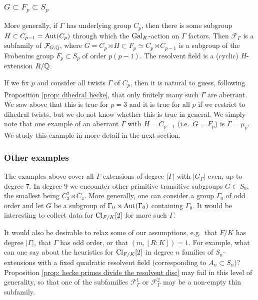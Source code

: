 \documentclass[11pt,a4paper]{amsart}
\newcommand{\artane}[1]{{\color{red} \sf $\clubsuit\clubsuit\clubsuit$ Artane: [#1]}}
\def\Q{{\rm \mathbb{Q}}}
\def\Aut{{\rm Aut}}
\def\Cl{{\rm Cl}}
\def\Gal{{\rm Gal}}
\numberwithin{equation}{section}
\begin{document}
\subsubsection{$G \subset F_p \subset S_p$}

More generally, if $\Gamma$ has underlying group $C_p$, then there is some subgroup $H \subset C_{p-1} = \Aut(C_p)$ through which the $\Gal_K$-action on $\Gamma$ factors. Then $\mathcal{F}_\Gamma$ is a subfamily of $\mathcal{F}_{G, \Q}$, where $G = C_p \rtimes H \subset F_p \simeq C_p \rtimes C_{p-1}$ is a subgroup of the Frobenius group $F_p \subset S_p$ of order $p(p-1)$.  The resolvent field is a (cyclic) $H$-extension $R/\Q$.

If we fix $p$ and consider all twists $\Gamma$ of $\underline{C_p}$, then it is natural to guess, following Proposition \ref{prop: dihedral hecke}, that only finitely many such $\Gamma$ are aberrant. We saw above that this is true for $p = 3$ and it is true for all $p$ if we restrict to dihedral twists, but we do not know whether this is true in general. We simply note that one example of an aberrant $\Gamma$ with $H = C_{p-1}$ (i.e.\ $G = F_p$) is $\Gamma = \mu_p$. We study this example in more detail in the next section.

\subsubsection{Other examples}
The examples above cover all $\Gamma$-extensions of degree $|\Gamma|$ with $|G_\Gamma|$ even, up to  degree $7$. In degree $9$ we encounter other primitive transitive subgroups $G \subset S_9$, the smallest being  $C_3^2 \rtimes C_4$. 
More generally, one can consider a group $\Gamma_0$ of odd order and let $G$ be a subgroup of $\Gamma_0 \rtimes \Aut(\Gamma_0)$ containing $\Gamma_0$.  It would be interesting to collect data for $\Cl_{F/K}[2]$ for more such $\Gamma$.

It would also be desirable to relax some of our assumptions, e.g.\ that $F/K$ has degree $|\Gamma|$, that $\Gamma$ has odd order, or that $(m,[R \colon K]) = 1$. For example, what can one say about the heuristics for $\Cl_{F/K}[2]$ in degree $n$ families of $S_n$-extensions with a fixed quadratic resolvent field (corresponding to $A_n \subset S_n$)? Proposition \ref{prop: hecke primes divide the resolvent disc} may fail in this level of generality, so that one of the subfamilies $\mathcal{F}_\Gamma^1$ or $\mathcal{F}_\Gamma^2$ may be a non-empty thin subfamily. 
\end{document}
